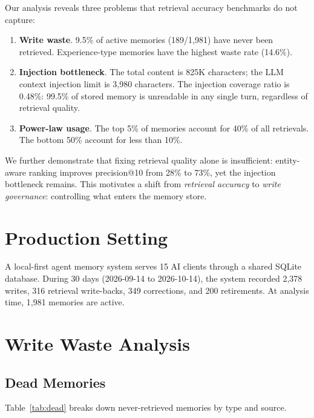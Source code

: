 \documentclass[10pt,twocolumn]{article}
\begin{document}
Our analysis reveals three problems that retrieval accuracy benchmarks do not capture:

\begin{enumerate}
\item \textbf{Write waste}. 9.5\% of active memories (189/1,981) have never been retrieved. Experience-type memories have the highest waste rate (14.6\%).
\item \textbf{Injection bottleneck}. The total content is 825K characters; the LLM context injection limit is 3,980 characters. The injection coverage ratio is 0.48\%: 99.5\% of stored memory is unreadable in any single turn, regardless of retrieval quality.
\item \textbf{Power-law usage}. The top 5\% of memories account for 40\% of all retrievals. The bottom 50\% account for less than 10\%.
\end{enumerate}

We further demonstrate that fixing retrieval quality alone is insufficient: entity-aware ranking improves precision@10 from 28\% to 73\%, yet the injection bottleneck remains. This motivates a shift from \emph{retrieval accuracy} to \emph{write governance}: controlling what enters the memory store.

\section{Production Setting}

A local-first agent memory system serves 15 AI clients through a shared SQLite database. During 30 days (2026-09-14 to 2026-10-14), the system recorded 2,378 writes, 316 retrieval write-backs, 349 corrections, and 200 retirements. At analysis time, 1,981 memories are active.

\section{Write Waste Analysis}

\subsection{Dead Memories}

Table~\ref{tab:dead} breaks down never-retrieved memories by type and source.
\end{document}
